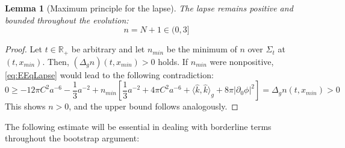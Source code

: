 \documentclass[11pt,leqno,textwidth=10cm]{amsart}
\numberwithin{equation}{section}
\theoremstyle{definition}
\theoremstyle{plain}
\newtheorem{lemma}[definition]{Lemma}
\newcommand{\1}{\mathbbm{1}}
\newcommand{\R}{\mathbb{R}}
\newcommand{\del}{\partial}
\newcommand{\Lap}{\Delta}
\begin{document}
\begin{lemma}[Maximum principle for the lapse]\label{lem:lapse-maxmin} The lapse remains positive and bounded throughout the evolution:
\begin{equation}
n=N+1\in(0,3]
\end{equation}
\end{lemma}
\begin{proof}
Let $t\in\R_+$ be arbitrary and let $n_{min}$ be the minimum of $n$ over $\Sigma_t$ at $(t,x_{min})$. Then, $(\Lap_g n)(t,x_{min})> 0$ holds. If $n_{min}$ were nonpositive, \eqref{eq:EEqLapse} would lead to the following contradiction:
\[0\geq -12\pi C^2a^{-6}-\frac13a^{-2}+n_{min}\left[\frac13a^{-2}+4\pi C^2a^{-6}+\langle\hat{k},\hat{k}\rangle_g+8\pi\lvert\del_0\phi\rvert^2\right]=\Lap_gn(t,x_{min})>0\]
This shows $n>0$, and the upper bound follows analogously.
\end{proof}


The following estimate will be essential in dealing with borderline terms throughout the bootstrap argument:
\end{document}
